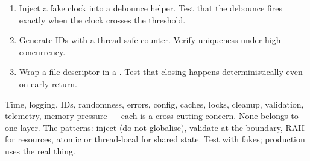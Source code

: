 \begin{enumerate}[leftmargin=*]
  \item Inject a fake clock into a debounce helper. Test that
    the debounce fires exactly when the clock crosses the
    threshold.
  \item Generate IDs with a thread-safe counter. Verify
    uniqueness under high concurrency.
  \item Wrap a file descriptor in a . Test that
    closing happens deterministically even on early return.
\end{enumerate}

\begin{recap}
Time, logging, IDs, randomness, errors, config, caches, locks,
cleanup, validation, telemetry, memory pressure --- each is a
cross-cutting concern. None belongs to one layer. The patterns:
inject (do not globalise), validate at the boundary, RAII for
resources, atomic or thread-local for shared state. Test with
fakes; production uses the real thing.
\end{recap}
